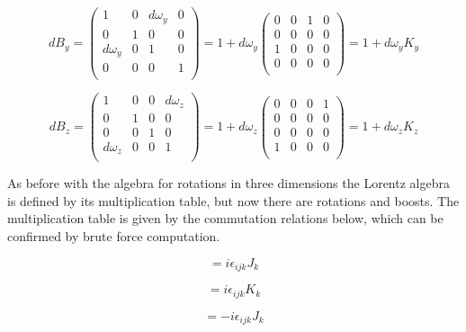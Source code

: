 \begin{equation}
dB_y = 
\begin{pmatrix}
1 & 0 & d\omega_y & 0 \\
0 & 1 & 0 & 0 \\
d\omega_y & 0 & 1 & 0 \\
0 & 0 & 0 & 1 \\
\end{pmatrix}
= 1 + d\omega_y
\begin{pmatrix}
0 & 0 & 1 & 0 \\
0 & 0 & 0 & 0 \\
1 & 0 & 0 & 0 \\
0 & 0 & 0 & 0 \\
\end{pmatrix}
= 1 + d\omega_y K_y
\end{equation}

\begin{equation}
dB_z = 
\begin{pmatrix}
1 & 0 & 0 & d\omega_z \\
0 & 1 & 0 & 0 \\
0 & 0 & 1 & 0 \\
d\omega_z & 0 & 0 & 1 \\
\end{pmatrix}
= 1 + d\omega_z
\begin{pmatrix}
0 & 0 & 0 & 1 \\
0 & 0 & 0 & 0 \\
0 & 0 & 0 & 0 \\
1 & 0 & 0 & 0 \\
\end{pmatrix}
= 1 + d\omega_z K_z
\end{equation}

As before with the algebra for rotations in three dimensions the Lorentz algebra is defined by its multiplication table, but now there are rotations and boosts. The multiplication table is given by the commutation relations below, which can be confirmed by brute force computation.  

\begin{equation}
[J_i, J_j] = i\epsilon_{ijk}J_k
\end{equation}

\begin{equation}
[J_i, K_j] = i\epsilon_{ijk}K_k
\end{equation}

\begin{equation}
[K_i, K_j] = -i\epsilon_{ijk}J_k
\end{equation}


